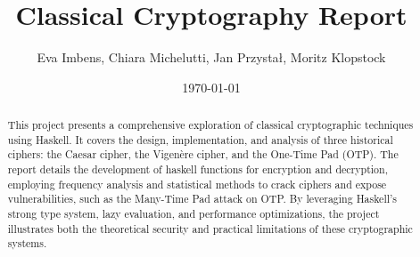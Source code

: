 \documentclass[12pt,a4paper]{article}
\title{Classical Cryptography Report}
\author{Eva Imbens, Chiara Michelutti, Jan Przystał, Moritz Klopstock}
\date{\today}
\begin{document}
\maketitle

\begin{abstract}
    This project presents a comprehensive exploration of classical cryptographic techniques using Haskell. It covers the design, implementation, and analysis of three historical ciphers: the Caesar cipher, the Vigenère cipher, and the One-Time Pad (OTP). The report details the development of haskell functions for encryption and decryption, employing frequency analysis and statistical methods to crack ciphers and expose vulnerabilities, such as the Many-Time Pad attack on OTP. By leveraging Haskell’s strong type system, lazy evaluation, and performance optimizations, the project illustrates both the theoretical security and practical limitations of these cryptographic systems.
\end{abstract}

\vfill

\tableofcontents

\clearpage






















\newpage



\end{document}
